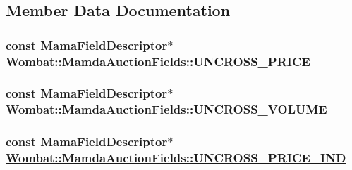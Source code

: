 \subsection{Member Data Documentation}
\hypertarget{classWombat_1_1MamdaAuctionFields_5594971ec726416241e33804da2d9fe5}{
\subsubsection[UNCROSS\_\-PRICE]{\setlength{\rightskip}{0pt plus 5cm}const Mama\-Field\-Descriptor$\ast$ \hyperlink{classWombat_1_1MamdaAuctionFields_5594971ec726416241e33804da2d9fe5}{Wombat::Mamda\-Auction\-Fields::UNCROSS\_\-PRICE}}}
\label{classWombat_1_1MamdaAuctionFields_5594971ec726416241e33804da2d9fe5}


\hypertarget{classWombat_1_1MamdaAuctionFields_bc9cf080d7f976785770153845aa82ac}{
\subsubsection[UNCROSS\_\-VOLUME]{\setlength{\rightskip}{0pt plus 5cm}const Mama\-Field\-Descriptor$\ast$ \hyperlink{classWombat_1_1MamdaAuctionFields_bc9cf080d7f976785770153845aa82ac}{Wombat::Mamda\-Auction\-Fields::UNCROSS\_\-VOLUME}}}
\label{classWombat_1_1MamdaAuctionFields_bc9cf080d7f976785770153845aa82ac}


\hypertarget{classWombat_1_1MamdaAuctionFields_f0f88cdc1024ea546447c3bcef022ec3}{
\subsubsection[UNCROSS\_\-PRICE\_\-IND]{\setlength{\rightskip}{0pt plus 5cm}const Mama\-Field\-Descriptor$\ast$ \hyperlink{classWombat_1_1MamdaAuctionFields_f0f88cdc1024ea546447c3bcef022ec3}{Wombat::Mamda\-Auction\-Fields::UNCROSS\_\-PRICE\_\-IND}}}
\label{classWombat_1_1MamdaAuctionFields_f0f88cdc1024ea546447c3bcef022ec3}


